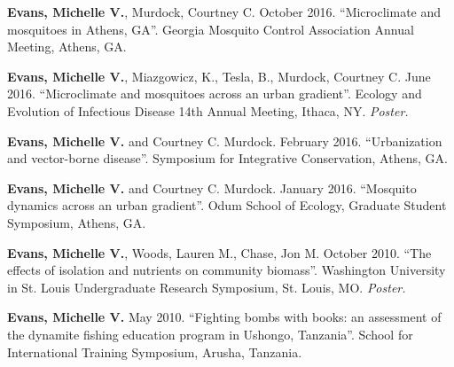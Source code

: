 \begin{cvitems}
	\item \textbf{Evans, Michelle V.}, Murdock, Courtney C. October 2016. ``Microclimate and mosquitoes in Athens, GA''. Georgia Mosquito Control Association Annual Meeting, Athens, GA.

	\item \textbf{Evans, Michelle V.}, Miazgowicz, K., Tesla, B., Murdock, Courtney C. June 2016. ``Microclimate and mosquitoes across an urban gradient''. Ecology and Evolution of Infectious Disease 14th Annual Meeting, Ithaca, NY. \textit{Poster.}

	\item \textbf{Evans, Michelle V.} and Courtney C. Murdock. February 2016. ``Urbanization and vector-borne disease''. Symposium for Integrative Conservation, Athens, GA.

	\item \textbf{Evans, Michelle V.} and Courtney C. Murdock. January 2016. ``Mosquito dynamics across an urban gradient''. Odum School of Ecology, Graduate Student Symposium, Athens, GA.

	\item \textbf{Evans, Michelle V.}, Woods, Lauren M., Chase, Jon M. October 2010. ``The effects of isolation and nutrients on community biomass''. Washington University in St. Louis Undergraduate Research Symposium, St. Louis, MO. \textit{Poster.}

	\item \textbf{Evans, Michelle V.} May 2010. ``Fighting bombs with books: an assessment of the dynamite fishing education program in Ushongo, Tanzania''. School for International Training Symposium, Arusha, Tanzania.

	\bigskip
\end{cvitems}
